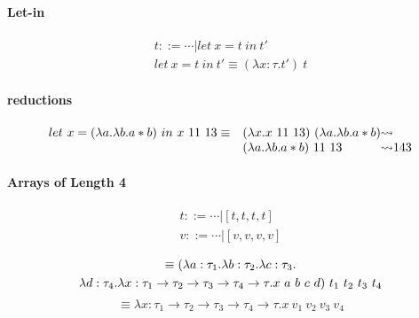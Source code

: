 \documentclass{article}
\newcommand{\lam}[2]{\ensuremath{\lambda#1.#2}}
\begin{document}
\paragraph{Let-in}
\begin{gather*}
    t ::= \cdots | let\ x=t\ in\ t' \\
    let\ x=t\ in\ t' \equiv (\lam{x:\tau}{t'})\ t
\end{gather*}
\paragraph{reductions}
\begin{align*}
    \begin{array}{r l @{\leadsto}l}
        let\ x=(\lam{a}\lam{b}{a*b})\ in\ x\ 11\ 13 \equiv & (\lam{x}{x\ 11\ 13})\ (\lam{a}\lam{b}{a*b}) \\
                                                           & (\lam{a}\lam{b}{a*b})\ 11\ 13 & 143 
    \end{array}
\end{align*}

\paragraph{Arrays of Length 4}
\begin{gather*}
    t ::= \cdots | [t,t,t,t] \\
    v ::= \cdots | [v,v,v,v] \\
\end{gather*}
\begin{multline*}
    [t_1,t_2,t_3,t_4] \equiv (\lam{a:\tau_1}\lam{b:\tau_2}\lam{c:\tau_3}\\ \lam{d:\tau_4}\lam{x:\tau_1\to\tau_2\to\tau_3\to\tau_4\to\tau}{x\ a\ b\ c\ d})\ t_1\ t_2\ t_3\ t_4
\end{multline*}
\begin{equation*}
    [v_1,v_2,v_3,v_4] \equiv \lam{x:\tau_1\to\tau_2\to\tau_3\to\tau_4\to\tau}{x\ v_1\ v_2\ v_3\ v_4}
\end{equation*}
\end{document}
